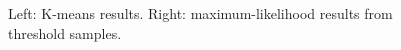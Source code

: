 \documentclass[12pt]{article}
\begin{document}
\begin{figure}[h!]
    \centering

    \begin{center}
    \end{center}

    \caption{Left: K-means results. Right: maximum-likelihood results from threshold samples.}
    \label{thresh_samples}
\end{figure}
\end{document}
